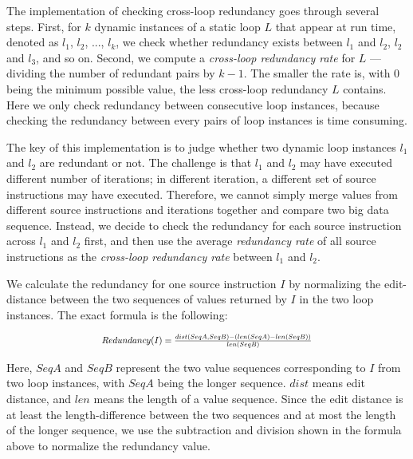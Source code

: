 The implementation of checking cross-loop redundancy goes through several
steps. First, for $k$ dynamic instances of a static loop $L$ that appear
at run time, denoted as $l_1$, $l_2$,
..., $l_k$, we check whether redundancy exists between $l_1$ and $l_2$, 
$l_2$ and $l_3$, and so on. Second, we compute a 
\textit{cross-loop redundancy rate} for $L$
--- dividing the number of redundant pairs by $k-1$.
The smaller the rate is, with 0 being the minimum possible value, the
less cross-loop redundancy $L$ contains.
Here we only check redundancy between consecutive loop instances, because  
checking the redundancy between every pairs of loop
instances is time consuming.

The key of this implementation is
to judge whether two dynamic loop instances $l_1$ and $l_2$ 
are redundant or not.
The challenge is that $l_1$ and $l_2$ may have executed different number of
iterations; in different iteration, a different set of source instructions
may have executed. Therefore, we cannot simply merge values from different
source instructions and iterations together and compare two big data sequence.
Instead, we decide to check the redundancy for each source instruction across
$l_1$ and $l_2$ first, and then use the average \textit{redundancy rate} of
all source instructions as the \textit{cross-loop redundancy rate} between
$l_1$ and $l_2$. 

We calculate the redundancy for one source instruction $I$ by normalizing the
edit-distance between the two sequences of values returned by $I$ in the two
loop instances. The exact formula is the following:


\[
\Scale[0.8]{
	Redundancy(I) =  \frac{dist(SeqA,SeqB) - (len(SeqA) - len(SeqB))}{len(SeqB)}
}
\]

Here, $SeqA$ and $SeqB$ represent the two value sequences corresponding to $I$
from two loop instances, with $SeqA$ being the longer sequence.
$dist$ means edit distance, and $len$ means the length of a value sequence.
Since the edit distance is at least the length-difference between the
two sequences and at most the length of the longer sequence, we use the 
subtraction and division shown in the formula above to normalize the
redundancy value.



